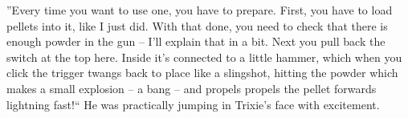 ''Every time you want to use one, you have to prepare. First, you have to load
pellets into it, like I just did. With that done, you need to check that there
is enough powder in the gun -- I'll explain that in a bit. Next you pull back
the switch at the top here. Inside it's connected to a little hammer, which when
you click the trigger twangs back to place like a slingshot, hitting the powder
which makes a small explosion -- a bang -- and propels propels the pellet
forwards lightning fast!`` He was practically jumping in Trixie's face with
excitement.
